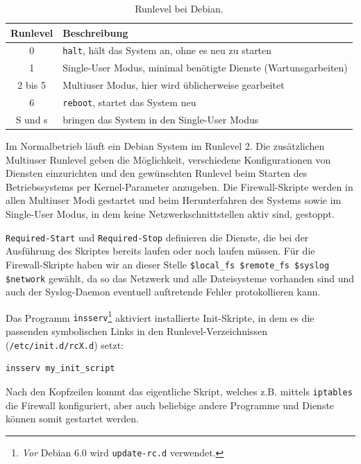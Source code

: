 \begin{table}[htb]
    \centering
    \begin{tabular}{|c|l|}
        \hline
        Runlevel & Beschreibung\\
        \hline
        0       & {\tt halt}, hält das System an, ohne es neu zu starten\\
        1       & Single-User Modus, minimal benötigte Dienste (Wartunsgarbeiten)\\
        2 bis 5 & Multiuser Modus, hier wird üblicherweise gearbeitet\\
        6       & {\tt reboot}, startet das System neu\\
        S und s & bringen das System in den Single-User Modus\\
        \hline
    \end{tabular}
   \caption{Runlevel bei Debian.}\label{tab.runlevel}
\end{table}

\noindent Im Normalbetrieb läuft ein Debian System im Runlevel 2.
Die zusätzlichen Multiuser Runlevel geben die Möglichkeit, verschiedene
Konfigurationen von Diensten einzurichten und den gewünschten Runlevel beim
Starten des Betriebssystems per Kernel-Parameter anzugeben.
Die Firewall-Skripte werden in allen Multiuser Modi gestartet und beim
Herunterfahren des Systems sowie im Single-User Modus, in dem keine
Netzwerkschnittstellen aktiv sind, gestoppt.

{\tt Required-Start} und {\tt Required-Stop} definieren die Dienste, die bei
der Aus\-füh\-rung des Skriptes bereits laufen oder noch laufen müssen.
Für die Firewall-Skripte haben wir an dieser Stelle
\verb!$local_fs $remote_fs $syslog $network! gewählt, da so das Netzwerk und
alle Dateisysteme vorhanden sind und auch der Syslog-Daemon eventuell
auftretende Fehler protokollieren kann.

Das Programm {\tt insserv}\footnote{
\emph{Vor} Debian 6.0 wird {\tt update-rc.d} verwendet.
} aktiviert installierte Init-Skripte, in dem es die passenden symbolischen
Links in den Runlevel-Verzeichnissen ({\tt /etc/init.d/rcX.d}) setzt:

\begin{verbatim}
insserv my_init_script
\end{verbatim}

Nach den Kopfzeilen kommt das eigentliche Skript, welches z.B. mittels
{\tt iptables} die Firewall konfiguriert, aber auch beliebige andere Programme
und Dienste können somit gestartet werden.

